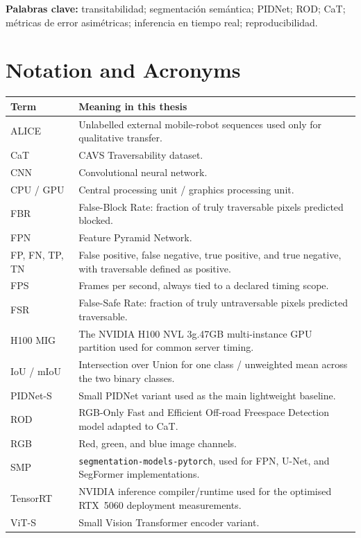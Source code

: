 \documentclass[12pt,a4paper]{report}
\begin{document}
\noindent\textbf{Palabras clave:} transitabilidad; segmentación semántica;
PIDNet; ROD; CaT; métricas de error asimétricas; inferencia en tiempo real;
reproducibilidad.

\clearpage
\chapter*{Notation and Acronyms}
\begin{longtable}{@{}p{}p{}@{}}
\toprule
\textbf{Term} & \textbf{Meaning in this thesis} \\
\midrule
ALICE & Unlabelled external mobile-robot sequences used only for qualitative transfer. \\
CaT & CAVS Traversability dataset. \\
CNN & Convolutional neural network. \\
CPU / GPU & Central processing unit / graphics processing unit. \\
FBR & False-Block Rate: fraction of truly traversable pixels predicted blocked. \\
FPN & Feature Pyramid Network. \\
FP, FN, TP, TN & False positive, false negative, true positive, and true negative, with traversable defined as positive. \\
FPS & Frames per second, always tied to a declared timing scope. \\
FSR & False-Safe Rate: fraction of truly untraversable pixels predicted traversable. \\
H100 MIG & The NVIDIA H100 NVL 3g.47GB multi-instance GPU partition used for common server timing. \\
IoU / mIoU & Intersection over Union for one class / unweighted mean across the two binary classes. \\
PIDNet-S & Small PIDNet variant used as the main lightweight baseline. \\
ROD & RGB-Only Fast and Efficient Off-road Freespace Detection model adapted to CaT. \\
RGB & Red, green, and blue image channels. \\
SMP & \texttt{segmentation-models-pytorch}, used for FPN, U-Net, and SegFormer implementations. \\
TensorRT & NVIDIA inference compiler/runtime used for the optimised RTX~5060 deployment measurements. \\
ViT-S & Small Vision Transformer encoder variant. \\
\bottomrule
\end{longtable}

\clearpage
\tableofcontents
\clearpage
{}
{}
\listoffigures
\clearpage
{}
{}
\listoftables
\clearpage
{}













\end{document}
